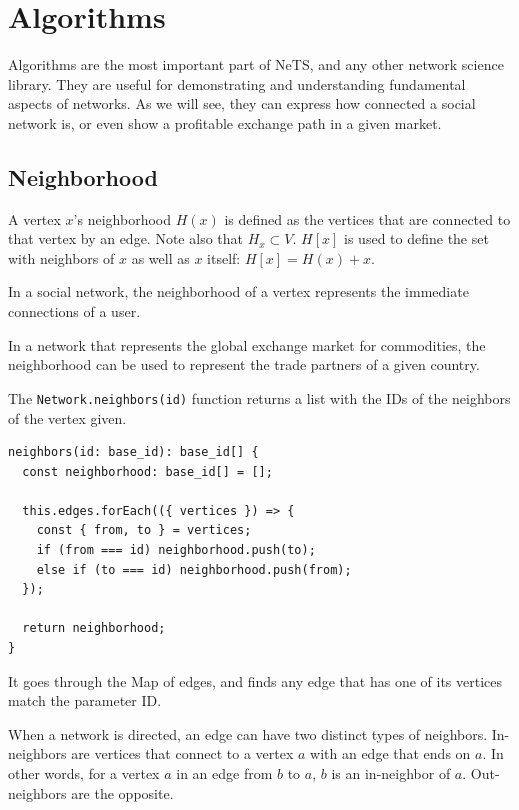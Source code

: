 \chapter{Algorithms}

Algorithms are the most important part of NeTS,
and any other network science library.
They are useful for demonstrating and understanding
fundamental aspects of networks.
As we will see, they can express how connected
a social network is, or even show a profitable exchange path
in a given market.

\section{Neighborhood}
A vertex $x$'s neighborhood $H(x)$ is defined as the vertices that are connected to that vertex
by an edge. Note also that $H_x\subset V$.
$H[x]$ is used to define the set with neighbors of $x$ as well as $x$ itself: $H[x]=H(x)+x$.

In a social network, the neighborhood of a vertex represents
the immediate connections of a user.

In a network that represents the global exchange market for
commodities, the neighborhood can be used to represent
the trade partners of a given country.

The \texttt{Network.neighbors(id)}
function returns a list with the IDs of the neighbors of the vertex given.

\begin{verbatim}
neighbors(id: base_id): base_id[] {
  const neighborhood: base_id[] = [];

  this.edges.forEach(({ vertices }) => {
    const { from, to } = vertices;
    if (from === id) neighborhood.push(to);
    else if (to === id) neighborhood.push(from);
  });

  return neighborhood;
}
\end{verbatim}

It goes through the Map of edges,
and finds any edge that has one of its vertices match the parameter ID.

When a network is directed, an edge can have two distinct types of neighbors.
In-neighbors are vertices that connect to a vertex $a$ with an edge that ends on $a$.
In other words, for a vertex $a$ in an edge from $b$ to $a$, $b$ is an in-neighbor of $a$.
Out-neighbors are the opposite.

